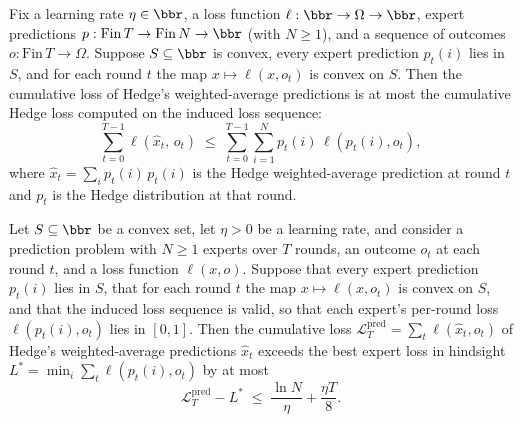 \begin{lemma}
\label{hedgePredictionCumLoss_le_hedgeCumLoss}
\leanok
{}
Fix a learning rate $\eta \in \bbr$, a loss function $\ell : \bbr \to \Omega \to \bbr$,
expert predictions $p : \mathrm{Fin}\,T \to \mathrm{Fin}\,N \to \bbr$ (with $N \ge 1$),
and a sequence of outcomes $o : \mathrm{Fin}\,T \to \Omega$. Suppose $S \subseteq \bbr$
is convex, every expert prediction $p_t(i)$ lies in $S$, and for each round $t$ the map
$x \mapsto \ell(x, o_t)$ is convex on $S$. Then the cumulative loss of Hedge's
weighted-average predictions is at most the cumulative Hedge loss computed on the
induced loss sequence:
\[
  \sum_{t=0}^{T-1} \ell\!\left(\widehat{x}_t,\, o_t\right)
  \;\le\;
  \sum_{t=0}^{T-1} \sum_{i=1}^{N} p_t(i)\,\ell\!\left(p_t(i), o_t\right),
\]
where $\widehat{x}_t = \sum_{i} p_t(i)\, p_t(i)$ is the Hedge weighted-average
prediction at round $t$ and $p_t$ is the Hedge distribution at that round.
\end{lemma}

\begin{theorem}
\label{hedgePrediction_regret_bound_tight}
\leanok
{}
Let $S \subseteq \bbr$ be a convex set, let $\eta > 0$ be a learning rate, and consider
a prediction problem with $N \ge 1$ experts over $T$ rounds, an outcome $o_t$ at each
round $t$, and a loss function $\ell(x, o)$. Suppose that every expert prediction
$p_t(i)$ lies in $S$, that for each round $t$ the map $x \mapsto \ell(x, o_t)$ is convex
on $S$, and that the induced loss sequence is valid, so that each expert's per-round
loss $\ell(p_t(i), o_t)$ lies in $[0,1]$. Then the cumulative loss
$\mathcal{L}^{\mathrm{pred}}_T = \sum_{t} \ell(\widehat{x}_t, o_t)$ of Hedge's
weighted-average predictions $\widehat{x}_t$ exceeds the best expert loss in hindsight
$L^* = \min_{i} \sum_{t} \ell(p_t(i), o_t)$ by at most
\[
  \mathcal{L}^{\mathrm{pred}}_T - L^* \;\le\; \frac{\ln N}{\eta} + \frac{\eta T}{8}.
\]
\end{theorem}

